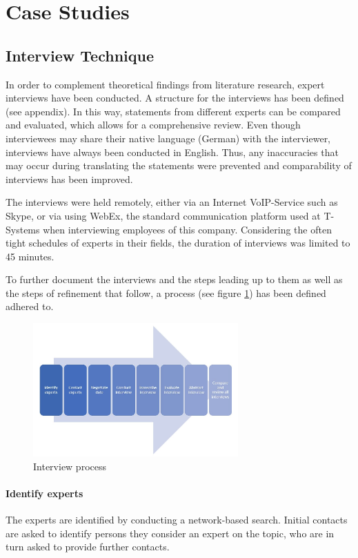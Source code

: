 
\section{Case Studies}

\subsection{Interview Technique}
In order to complement theoretical findings from literature research, expert interviews have been conducted. A structure for the interviews has been defined (see appendix). In this way, statements from different experts can be compared and evaluated, which allows for a comprehensive review. Even though interviewees may share their native language (German) with the interviewer, interviews have always been conducted in English. Thus, any inaccuracies that may occur during translating the statements were prevented and comparability of interviews has been improved.

The interviews were held remotely, either via an Internet VoIP-Service such as Skype, or via using WebEx, the standard communication platform used at T-Systems when interviewing employees of this company. Considering the often tight schedules of experts in their fields, the duration of interviews was limited to 45 minutes.

To further document the interviews and the steps leading up to them as well as the steps of refinement that follow, a process (see figure \ref{fig:Intprocess}) has been defined adhered to. 

\begin{figure}[htb]
	\centering
	\includegraphics[width=0.7\textwidth]{Pictures/Interview_process}
	\caption{Interview process}
	\label{fig:Intprocess}
\end{figure}

\paragraph{Identify experts} The experts are identified by conducting a network-based search. Initial contacts are asked to identify persons they consider an expert on the topic, who are in turn asked to provide further contacts.
